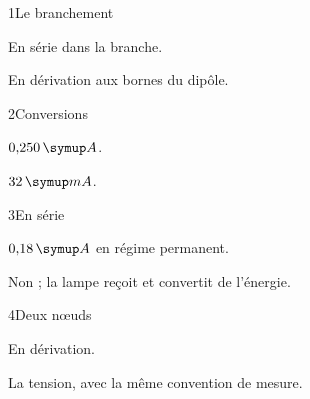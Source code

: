 \par\noindent\begin{minipage}{\linewidth}
\begin{corrige}{1}{Le branchement}
\begin{questions}
\item En série dans la branche.
\item En dérivation aux bornes du dipôle.
\end{questions}
\end{corrige}
\end{minipage}
\par\noindent\begin{minipage}{\linewidth}
\begin{corrige}{2}{Conversions}
\begin{questions}
\item $0{,}250\unite A$.
\item $32\unite{mA}$.
\end{questions}
\end{corrige}
\end{minipage}
\par\noindent\begin{minipage}{\linewidth}
\begin{corrige}{3}{En série}
\begin{questions}
\item $0{,}18\unite A$ en régime permanent.
\item Non ; la lampe reçoit et convertit de l’énergie.
\end{questions}
\end{corrige}
\end{minipage}
\par\noindent\begin{minipage}{\linewidth}
\begin{corrige}{4}{Deux nœuds}
\begin{questions}
\item En dérivation.
\item La tension, avec la même convention de mesure.
\end{questions}
\end{corrige}
\end{minipage}

